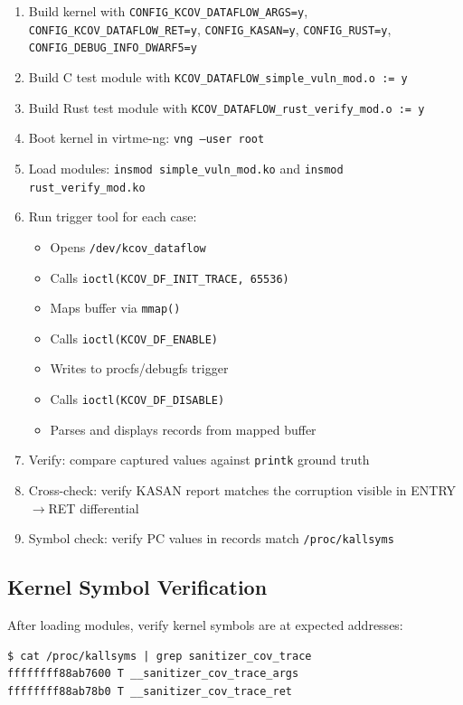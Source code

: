 \documentclass{ndss}
\begin{document}
\begin{enumerate}
  \item Build kernel with \texttt{CONFIG\_KCOV\_DATAFLOW\_ARGS=y},
        \texttt{CONFIG\_KCOV\_DATAFLOW\_RET=y}, \texttt{CONFIG\_KASAN=y},
        \texttt{CONFIG\_RUST=y}, \texttt{CONFIG\_DEBUG\_INFO\_DWARF5=y}
  \item Build C test module with \texttt{KCOV\_DATAFLOW\_simple\_vuln\_mod.o := y}
  \item Build Rust test module with \texttt{KCOV\_DATAFLOW\_rust\_verify\_mod.o := y}
  \item Boot kernel in virtme-ng: \texttt{vng --user root}
  \item Load modules: \texttt{insmod simple\_vuln\_mod.ko} and
        \texttt{insmod rust\_verify\_mod.ko}
  \item Run trigger tool for each case:
        \begin{itemize}[nosep]
          \item Opens \texttt{/dev/kcov\_dataflow}
          \item Calls \texttt{ioctl(KCOV\_DF\_INIT\_TRACE, 65536)}
          \item Maps buffer via \texttt{mmap()}
          \item Calls \texttt{ioctl(KCOV\_DF\_ENABLE)}
          \item Writes to procfs/debugfs trigger
          \item Calls \texttt{ioctl(KCOV\_DF\_DISABLE)}
          \item Parses and displays records from mapped buffer
        \end{itemize}
  \item Verify: compare captured values against \texttt{printk} ground truth
  \item Cross-check: verify KASAN report matches the corruption visible in
        ENTRY$\to$RET differential
  \item Symbol check: verify PC values in records match \texttt{/proc/kallsyms}
\end{enumerate}

\subsection{Kernel Symbol Verification}

After loading modules, verify kernel symbols are at expected addresses:
\begin{lstlisting}[numbers=none]
$ cat /proc/kallsyms | grep sanitizer_cov_trace
ffffffff88ab7600 T __sanitizer_cov_trace_args
ffffffff88ab78b0 T __sanitizer_cov_trace_ret
\end{lstlisting}
\end{document}
